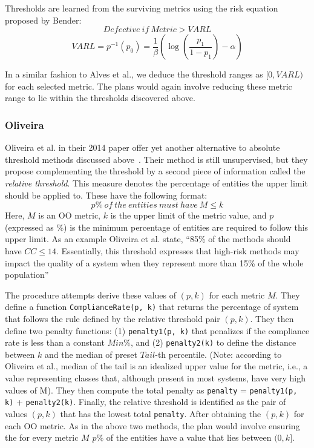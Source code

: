 \documentclass[smallextended]{svjour3}       %
\begin{document}
Thresholds are learned from the surviving metrics using
the risk equation proposed by Bender:
$$ \mathit{Defective\ if}\ \mathit{Metric} > \mathit{VARL}$$
$$
	\mathit{VARL} = p^{-1}(p_0) = \frac{1}{\beta }\left( {\log \left( 
		{\frac{{{p_1}}}{{1 - {p_1}}}} \right) - \alpha } \right)
$$

In a similar fashion to Alves et al., we deduce the threshold ranges as $[0, VARL)$ for each selected metric. The plans would again involve reducing these metric range to lie within the thresholds discovered above.

\subsubsection{Oliveira}
Oliveira et al. in their 2014 paper offer yet another alternative to absolute threshold methods discussed above~\cite{oliveira}. Their method is still unsupervised, but they propose complementing the threshold by a second piece of information called the \textit{relative threshold}. This measure denotes the percentage of entities the upper limit should be applied to. These have the following format:
\[p\%\ of\ the\ entities\ must\ have\ M\leq k\]
Here, $M$ is an OO metric, $k$ is the upper limit of the metric value, and $p$ (expressed as \%) is the minimum percentage of entities are required to follow this upper limit. As an example Oliveira et al. state, ``85\% of the methods should have $CC \leq 14$. Essentially, this threshold expresses that high-risk methods may impact the quality of a system when they represent more than 15\% of the whole population''

The procedure attempts derive these values of $(p, k)$ for each metric $M$. They define a function \texttt{ComplianceRate(p, k)} that returns the percentage of system that follows the rule defined by the relative threshold pair $(p, k)$. They then define two penalty functions: (1) \texttt{penalty1(p, k)} that penalizes if the compliance rate is less than a constant $Min\%$, and (2) \texttt{penalty2(k)} to define the distance between $k$ and the median of preset $Tail$-th percentile. (Note: according to Oliveira et al., median of the tail is an idealized upper value for the metric, i.e., a value representing classes that, although present in most systems, have very high values of M). They then compute the total penalty as \texttt{penalty} = \texttt{penalty1(p, k)} + \texttt{penalty2(k)}. Finally, the relative threshold is identified as the pair of values $(p, k)$ that has the lowest total \texttt{penalty}. After obtaining the $(p, k)$ for each OO metric. As in the above two methods, the plan would involve ensuring the for every metric $M$ $p\%$ of the entities have a value that lies between $(0, k]$. 
\end{document}
